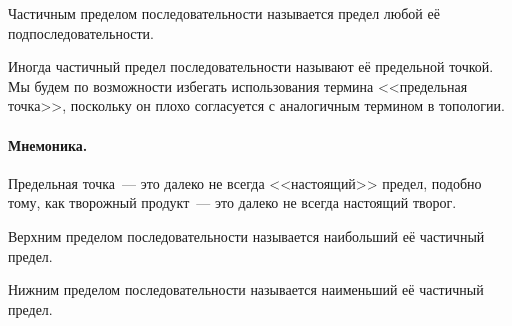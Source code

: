 \begin{opr}
	Частичным пределом последовательности называется предел любой её подпоследовательности.
\end{opr}

\begin{zamech}
	Иногда частичный предел последовательности называют её предельной точкой.
	Мы будем по возможности избегать использования термина <<предельная точка>>,
	поскольку он плохо согласуется с аналогичным термином в топологии.
\end{zamech}

\paragraph{Мнемоника.}
	Предельная точка~--- это далеко не всегда <<настоящий>> предел,
	подобно тому, как творожный продукт~--- это далеко не всегда настоящий творог.

\begin{opr}
	Верхним пределом последовательности называется наибольший её частичный предел.
\end{opr}

\begin{opr}
	Нижним пределом последовательности называется наименьший её частичный предел.
\end{opr}
